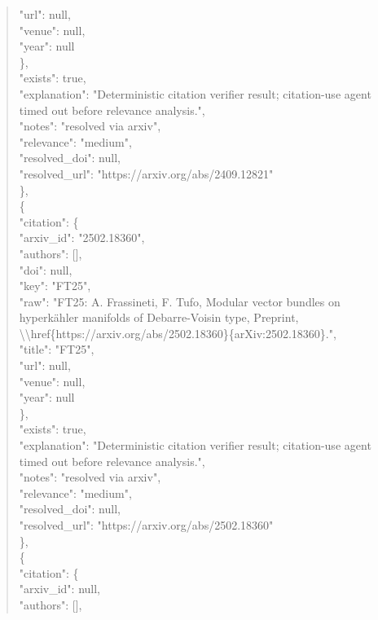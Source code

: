 \documentclass[11pt]{article}
\begin{document}
\begin{quote}
        "url": null,\\
        "venue": null,\\
        "year": null\\
      \},\\
      "exists": true,\\
      "explanation": "Deterministic citation verifier result; citation-use agent timed out before relevance analysis.",\\
      "notes": "resolved via arxiv",\\
      "relevance": "medium",\\
      "resolved\_doi": null,\\
      "resolved\_url": "https://arxiv.org/abs/2409.12821"\\
    \},\\
    \{\\
      "citation": \{\\
        "arxiv\_id": "2502.18360",\\
        "authors": [],\\
        "doi": null,\\
        "key": "FT25",\\
        "raw": "FT25: A. Frassineti, F. Tufo, Modular vector bundles on hyperkähler manifolds of Debarre-Voisin type, Preprint, \textbackslash{}\textbackslash{}href\{https://arxiv.org/abs/2502.18360\}\{arXiv:2502.18360\}.",\\
        "title": "FT25",\\
        "url": null,\\
        "venue": null,\\
        "year": null\\
      \},\\
      "exists": true,\\
      "explanation": "Deterministic citation verifier result; citation-use agent timed out before relevance analysis.",\\
      "notes": "resolved via arxiv",\\
      "relevance": "medium",\\
      "resolved\_doi": null,\\
      "resolved\_url": "https://arxiv.org/abs/2502.18360"\\
    \},\\
    \{\\
      "citation": \{\\
        "arxiv\_id": null,\\
        "authors": [],\\

\end{quote}
\end{document}
